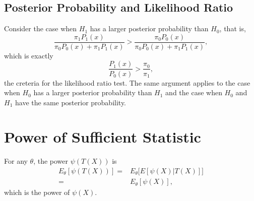 \documentclass[12pt]{article}
\begin{document}
\subsection{Posterior Probability and Likelihood Ratio}

Consider the case when $H_1$ has a larger posterior probability than $H_0$,
that is,
\[
  \frac{\pi_1 P_1(x)}{\pi_0 P_0(x) + \pi_1 P_1(x)}
  > \frac{\pi_0 P_0(x)}{\pi_0 P_0(x) + \pi_1 P_1(x)},
\]
which is exactly
\[
  \frac{P_1(x)}{P_0(x)} > \frac{\pi_0}{\pi_1},
\]
the creteria for the likelihood ratio test.
The same argument applies to
the case when $H_0$ has a larger posterior probability than $H_1$
and the case when $H_0$ and $H_1$ have the same posterior probability.

\section{Power of Sufficient Statistic}

For any $\theta$, the power $\psi(T(X))$ is
\begin{align*}
  E_\theta[\psi(T(X))]
  = & E_\theta\Big[ E[ \psi(X) | T(X)] \Big] \\
  = & E_\theta[\psi(X)],
\end{align*}
which is the power of $\psi(X)$.
  

  


  
    


  



      
\end{document}
